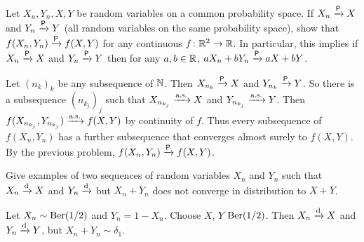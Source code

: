 \documentclass[12pt]{article}
\begin{document}
\begin{problem*}
    Let $X_n, Y_n, X, Y$ be random variables on a common probability space.
    If $X_n \xrightarrow{\mathsf{P}} X$ and $Y_n \xrightarrow{\mathsf{P}} Y$ (all random variables on the same
    probability space), show that $f(X_n, Y_n) \xrightarrow{\mathsf{P}} f(X, Y)$ for any
    continuous $f\colon \mathbb{R}^2 \to \mathbb{R}$.
    In particular, this implies if $X_n \xrightarrow{\mathsf{P}} X$ and $Y_n \xrightarrow{\mathsf{P}} Y$ then for
    any $a, b \in \mathbb{R}$, $aX_n + bY_n \xrightarrow{\mathsf{P}} aX + bY$.
\end{problem*}
\begin{solution}
    Let $(n_k)_k$ be any subsequence of $\mathbb{N}$.
    Then $X_{n_k} \xrightarrow{\mathsf{P}} X$ and $Y_{n_k} \xrightarrow{\mathsf{P}} Y$.
    So there is a subsequence $(n_{k_j})_j$ such that
    $X_{n_{k_j}} \xrightarrow{\text{a.s.}} X$ and $Y_{n_{k_j}} \xrightarrow{\text{a.s.}} Y$.
    Then $f(X_{n_{k_j}}, Y_{n_{k_j}}) \xrightarrow{\text{a.s.}} f(X, Y)$ by continuity of $f$.
    Thus every subsequence of $f(X_n, Y_n)$ has a further subsequence that
    converges almost surely to $f(X, Y)$.
    By the previous problem, $f(X_n, Y_n) \xrightarrow{\mathsf{P}} f(X, Y)$.
\end{solution}

\begin{problem*}
    Give examples of two sequences of random variables $X_n$ and $Y_n$ such
    that $X_n \xrightarrow{\text{d}} X$ and $Y_n \xrightarrow{\text{d}} $ but $X_n + Y_n$ does not converge in
    distribution to $X + Y$.
\end{problem*}
\begin{solution}
    Let $X_n \sim \operatorname{Ber}(1/2)$ and $Y_n = 1 - X_n$.
    Choose $X$, $Y$ \iid $\operatorname{Ber}(1/2)$.
    Then $X_n \xrightarrow{\text{d}} X$ and $Y_n \xrightarrow{\text{d}} Y$, but $X_n + Y_n \sim \delta_1$.
\end{solution}
\end{document}
